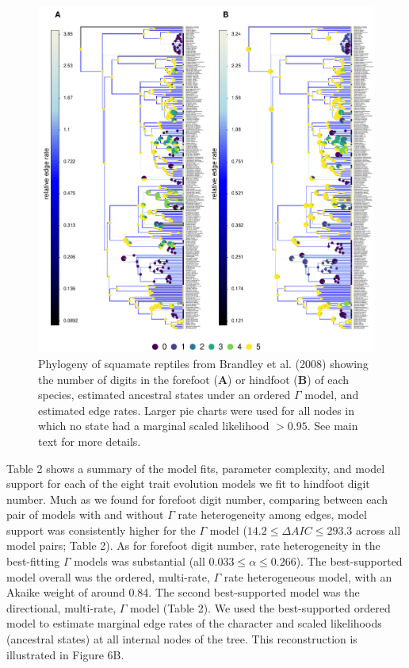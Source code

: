 \documentclass[fleqn,10pt,lineno]{wlpeerj} %
\begin{document}
\begin{figure}
\includegraphics[width=1\linewidth]{Revell-and-Harmon.fitgammaMk.PeerJ_files/figure-latex/Revell-and-Harmon-fig6-1} \caption{Phylogeny of squamate reptiles from Brandley et al. (2008) showing the number of digits in the forefoot (\textbf{A}) or hindfoot (\textbf{B}) of each species, estimated ancestral states under an ordered $\Gamma$ model, and estimated edge rates. Larger pie charts were used for all nodes in which no state had a marginal scaled likelihood $> 0.95$. See main text for more details.}\label{fig:Revell-and-Harmon-fig6}
\end{figure}

Table 2 shows a summary of the model fits, parameter complexity, and model support for each of the eight trait evolution models we fit to hindfoot digit number. Much as we found for forefoot digit number, comparing between each pair of models with and without \(\Gamma\) rate heterogeneity among edges, model support was consistently higher for the \(\Gamma\) model (\(14.2 \le \Delta AIC \le 293.3\) across all model pairs; Table 2). As for forefoot digit number, rate heterogeneity in the best-fitting \(\Gamma\) models was substantial (all \(0.033 \le \alpha \le 0.266\)). The best-supported model overall was the ordered, multi-rate, \(\Gamma\) rate heterogeneous model, with an Akaike weight of around 0.84. The second best-supported model was the directional, multi-rate, \(\Gamma\) model (Table 2). We used the best-supported ordered model to estimate marginal edge rates of the character and scaled likelihoods (ancestral states) at all internal nodes of the tree. This reconstruction is illustrated in Figure 6B.
\end{document}
